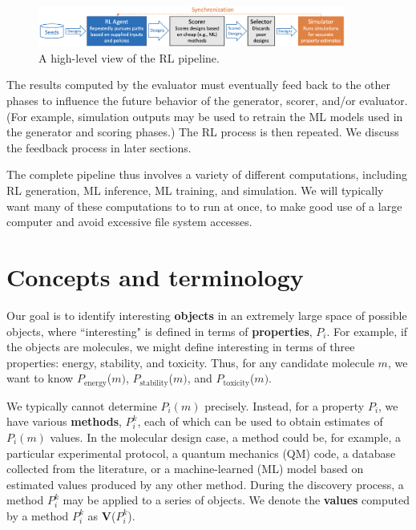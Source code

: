\documentclass[10pt]{article}
\begin{document}
\begin{figure}[h]
  \centering
  \includegraphics[width=0.9\textwidth,trim=0in 0in 0in 0in,clip]{./Figs/pipe.png}
  \vspace{-1.5ex}
  \caption{A high-level view of the RL pipeline.}
\label{fig:pipe}
\end{figure}


The results computed by the evaluator must eventually feed back to the other phases to influence the future behavior of the generator, scorer, and/or evaluator. 
(For example, simulation outputs may be used to retrain the ML models used in the generator and scoring phases.)
The RL process is then repeated.
We discuss the feedback process in later sections.

The complete pipeline thus involves a variety of different computations, including RL generation,  ML inference, ML training, and simulation.
We will typically want many of these computations to to run at once, to make good use of a large computer and avoid excessive file system accesses.


\section{Concepts and terminology}

Our goal is to identify interesting \textbf{objects} in an extremely large space of possible objects,
where ``interesting" is defined in terms of \textbf{properties}, $P_i$.
For example, if the objects are molecules, we might define interesting in terms of three properties: energy, stability, and toxicity.
Thus, for any candidate molecule $m$, we want to know $P_{\textrm{energy}}$($m)$, $P_{\textrm{stability}}$($m)$, and $P_{\textrm{toxicity}}$($m)$.

We typically cannot determine $P_i(m)$ precisely. Instead, for a property $P_i$, we have various \textbf{methods}, $P_i^k$, 
each of which can be used to obtain estimates of $P_i(m)$ values. In the molecular design case, a method could be, for example, 
a particular experimental protocol,
a quantum mechanics (QM) code,
a database collected from the literature, or
a machine-learned (ML) model based on estimated values produced by any other method.
During the discovery process, a method $P_i^k$ may be applied to a series of objects. 
We denote the \textbf{values} computed by a method $P_i^k$ as \textbf{V}($P_i^k$).
\end{document}
